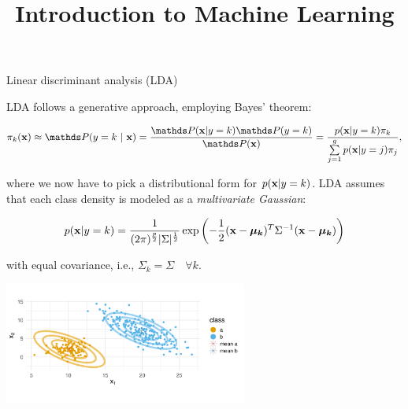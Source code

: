 \documentclass[11pt,compress,t,notes=noshow, xcolor=table]{beamer}
\title{Introduction to Machine Learning}
\begin{document}

\begin{vbframe}{Linear discriminant analysis (LDA)}

\begin{small}
LDA follows a generative approach, employing Bayes' theorem:

$$\pikx \approx \postk = \frac{\P(\xv | y = k) \P(y = k)}{\P(\xv)} = \frac{\pdfxyk \pik}{\sumjg \pdfxyk[j] \pi_j},$$

where we now have to pick a distributional form for $p(\mathbf{x} | y= k)$. LDA assumes that each class density is modeled as a \emph{multivariate Gaussian}:

$$
p(\mathbf{x} | y= k) = \frac{1}{(2\pi)^{\frac{p}{2}}|\Sigma|^{\frac{1}{2}}} \exp\left(-\frac{1}{2}(\mathbf{x} - \bm{\mu_{k}})^T \Sigma^{-1} (\mathbf{x} - \bm{\mu_{k}})\right)
$$

with equal covariance, i.e., $\Sigma_k = \Sigma \quad \forall k$.
\end{small}

\vspace{-0.9em}
\begin{center}
\includegraphics[width=0.60\textwidth, clip=true, trim={0 75 0 45}]{figure/disc_analysis-lda_2.png}
\end{center}
\end{vbframe}
\end{document}
